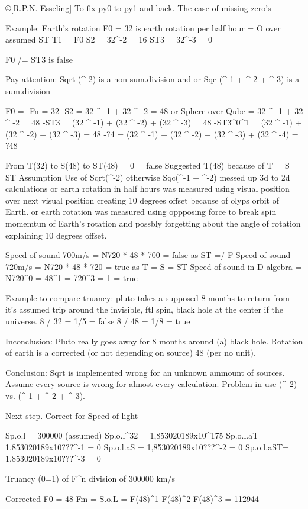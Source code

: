 \copyright[{R.P.N. Esseling}]
To fix py0 to py1 and back. The case of missing zero's

Example: Earth's rotation
F0 = 32 is earth rotation per half hour = O over assumed ST 
T1 = F0
S2 = 32^-2 = 16 
ST3 = 32^-3 = 0

F0 /= ST3 is false

Pay attention: Sqrt (^-2) is a non sum.division 
and or Sqc (^-1 + ^-2 + ^-3) is a sum.division

F0 = -Fn = 32 
-S2 = 32 ^ -1 + 32 ^ -2 = 48 or Sphere over Qube = 32 ^ -1 + 32 ^ -2 = 48
-ST3 = (32 ^ -1) + (32 ^ -2) + (32 ^ -3) = 48
-ST3^0^1 = (32 ^ -1) + (32 ^ -2) + (32 ^ -3) = 48
-?4 = (32 ^ -1) + (32 ^ -2) + (32 ^ -3) + (32 ^ -4) = ?48 

From T(32) to S(48) to ST(48) = 0 = false
Suggested T(48) because of T = S = ST
Assumption Use of Sqrt(^-2) otherwise Sqc(^-1 + ^-2) 
messed up 3d to 2d calculations 
or earth rotation in half hours was measured using visual position over 
next visual position creating 10 degrees offset because of olyps orbit of Earth.
or earth rotation was measured using oppposing force
to break spin momemtun of Earth's rotation and possbly forgetting 
about the angle of rotation explaining 10 degrees offset.

Speed of sound 700m/s = N720 * 48 * 700 = false as ST =/ F
Speed of sound 720m/s = N720 * 48 * 720 = true as T = S = ST 
Speed of sound in D-algebra = N720^0 = 48^1 = 720^3 = 1 = true

Example to compare truancy:
pluto takes a supposed 8 months to return from it's assumed trip around 
the invisible, ftl spin, black hole at the center if the universe.
8 / 32 = 1/5 = false
8 / 48 = 1/8 = true

Inconclusion: Pluto really goes away for 8 months around (a) black hole.
Rotation of earth is a corrected (or not depending on source) 48 (per no unit).

Conclusion: Sqrt is implemented wrong for an unknown ammount of sources. 
Assume every source is wrong for almost every calculation.
Problem in use (^-2) vs. (^-1 + ^-2 + ^-3). 

Next step. Correct for Speed of light
 
Sp.o.l    = 300000 (assumed)
Sp.o.l^32 = 1,853020189x10^175
Sp.o.l.aT = 1,853020189x10???^-1 = 0
Sp.o.l.aS = 1,853020189x10???^-2 = 0
Sp.o.l.aST= 1,853020189x10???^-3 = 0

Truancy (0=1) of F^n division of 300000 km/s

Corrected
F0 = 48
Fm = S.o.L = F(48)^1 F(48)^2 F(48)^3 = 112944

